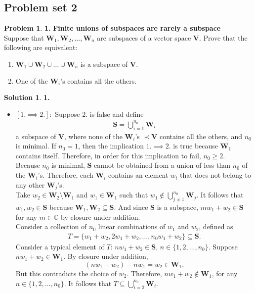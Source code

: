 \documentclass{article}
\theoremstyle{definition}
\newtheorem*{prob*}{Problem}
\newtheorem*{sln*}{Solution}
\newcommand{\V}{\mathbf{V}}
\newcommand{\W}{\mathbf{W}}
\begin{document}
\subsection{Problem set 2}
\begin{prob*}\textbf{1.}
	\textbf{Finite unions of subspaces are rarely a subspace}\\
	Suppose that $\W_1,\W_2,\dots,\W_n$ are subspaces of a vector space $\V$. Prove that the following are equivalent:
	\begin{enumerate}
		\item $\W_1 \cup \W_2\cup\dots\cup\W_n$ is a subspace of $\V$.
		\item One of the $\W_i$'s contains all the others. 
	\end{enumerate}
	
	
	\begin{sln*}\textbf{1.}
		$\,$
		\begin{itemize}
			\item $[1. \implies 2.]:$ Suppose $2.$ is false and define 
			\begin{align*}
			\mathbf{S} = \bigcup_{i=1}^{n_0}\W_i
			\end{align*}
			a subspace of $\V$, where none of the $\W_i$'s $\prec \V$ contains all the others, and $n_0$ is minimal. If $n_0=1$, then the implication $1. \implies 2.$ is true because $\W_1$ contains itself. Therefore, in order for this implication to fail, $n_0 \geq 2$.\\
			
			Because $n_0$ is minimal, $\mathbf{S}$ cannot be obtained from a union of less than $n_0$ of the $\W_i$'s. Therefore, each $\W_i$ contains an element $w_i$ that does not belong to any other $\W_j$'s.\\
			
			Take $w_2\in\W_2\setminus \W_1$ and $w_1 \in \W_1$ such that $w_1 \notin \bigcup_{j\neq 1}^{n_0}\W_j$. It follows that $w_1, w_2 \in \mathbf{S}$ because $\W_1, \W_2 \subseteq \mathbf{S}$. And since $\mathbf{S}$ is a subspace, $mw_1 + w_2 \in \mathbf{S}$ for any $m\in\mathbb{C}$ by closure under addition. \\
			
			Consider a collection of $n_0$ linear combinations of $w_1$ and $w_2$, defined as
			\begin{align*}
			T = \{ w_1+w_2,2w_1+w_2,\dots,n_0 w_1 + w_2\} \subseteq \mathbf{S}.
			\end{align*}
			Consider a typical element of $T$: $n w_1 + w_2 \in \mathbf{S}$, $n\in\{1,2,\dots,n_0\}$. Suppose $n w_1 + w_2 \in \W_1$. By closure under addition, $$(nw_1 + w_2) - nw_1 = w_2\in \W_1.$$ But this contradicts the choice of $w_2$. Therefore, $nw_1 + w_2 \notin \W_1$, for any $n\in\{1,2,\dots,n_0\}$. It follows that $T \subseteq \bigcup_{i=2}^{n_0} \W_i$. \\
			

\end{itemize}
\end{sln*}
\end{prob*}
\end{document}
